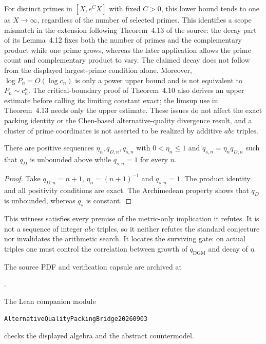For distinct primes in $[X,e^CX]$ with fixed $C>0$, this lower bound tends to
one as $X\to\infty$, regardless of the number of selected primes.  This identifies
a scope mismatch in the extension following Theorem~4.13 of the source:
the decay part of its Lemma~4.12 fixes both the number of primes and the
complementary product while one prime grows, whereas the later application
allows the prime count and complementary product to vary.  The claimed decay
does not follow from the displayed largest-prime condition alone.  Moreover,
$\log P_n=O(\log c_n)$ is only a power upper bound and is not equivalent to
$P_n\sim c_n^\kappa$.  The critical-boundary proof of Theorem~4.10 also
derives an upper estimate before calling its limiting constant exact; the
limsup use in Theorem~4.13 needs only the upper estimate.  These issues do not
affect the exact packing identity or the Chen-based alternative-quality
divergence result, and a cluster of prime coordinates is not asserted to be
realized by additive $abc$ triples.

\begin{proposition}
\label{prop:alternative-quality-divergence-no-go}
There are positive sequences $\eta_n,q_{D,n},q_{s,n}$ with
$0<\eta_n\le1$ and $q_{s,n}=\eta_nq_{D,n}$ such that $q_D$ is unbounded
above while $q_{s,n}=1$ for every $n$.
\end{proposition}

\begin{proof}
Take $q_{D,n}=n+1$, $\eta_n=(n+1)^{-1}$ and $q_{s,n}=1$.  The product
identity and all positivity conditions are exact.  The Archimedean property
shows that $q_D$ is unbounded, whereas $q_s$ is constant.
\end{proof}

This witness satisfies every premise of the metric-only implication it
refutes.  It is not a sequence of integer $abc$ triples, so it neither
refutes the standard conjecture nor invalidates the arithmetic search.  It
locates the surviving gate: on actual triples one must control the
correlation between growth of $q_{\mathrm{DGM}}$ and decay of $\eta$.

The source PDF and verification capsule are archived at
\begin{center}
.
\end{center}
The Lean companion module
\begin{center}
\texttt{AlternativeQualityPackingBridge20260903}
\end{center}
checks the displayed algebra and the abstract countermodel.
